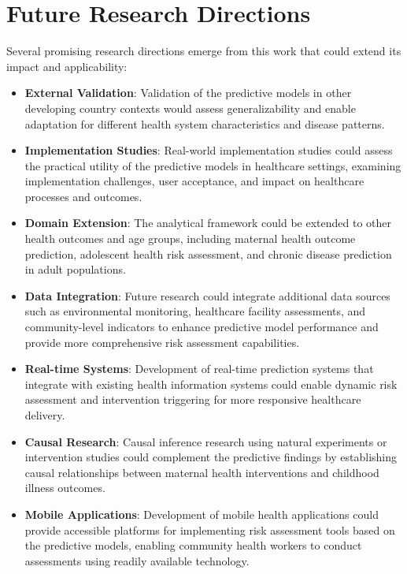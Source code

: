 \documentclass[12pt]{report}
\begin{document}
\section{Future Research Directions}

Several promising research directions emerge from this work that could extend its impact and applicability:

\begin{itemize}
    \item \textbf{External Validation}: Validation of the predictive models in other developing country contexts would assess generalizability and enable adaptation for different health system characteristics and disease patterns.
    
    \item \textbf{Implementation Studies}: Real-world implementation studies could assess the practical utility of the predictive models in healthcare settings, examining implementation challenges, user acceptance, and impact on healthcare processes and outcomes.
    
    \item \textbf{Domain Extension}: The analytical framework could be extended to other health outcomes and age groups, including maternal health outcome prediction, adolescent health risk assessment, and chronic disease prediction in adult populations.
    
    \item \textbf{Data Integration}: Future research could integrate additional data sources such as environmental monitoring, healthcare facility assessments, and community-level indicators to enhance predictive model performance and provide more comprehensive risk assessment capabilities.
    
    \item \textbf{Real-time Systems}: Development of real-time prediction systems that integrate with existing health information systems could enable dynamic risk assessment and intervention triggering for more responsive healthcare delivery.
    
    \item \textbf{Causal Research}: Causal inference research using natural experiments or intervention studies could complement the predictive findings by establishing causal relationships between maternal health interventions and childhood illness outcomes.
    
    \item \textbf{Mobile Applications}: Development of mobile health applications could provide accessible platforms for implementing risk assessment tools based on the predictive models, enabling community health workers to conduct assessments using readily available technology.
\end{itemize}
\end{document}
